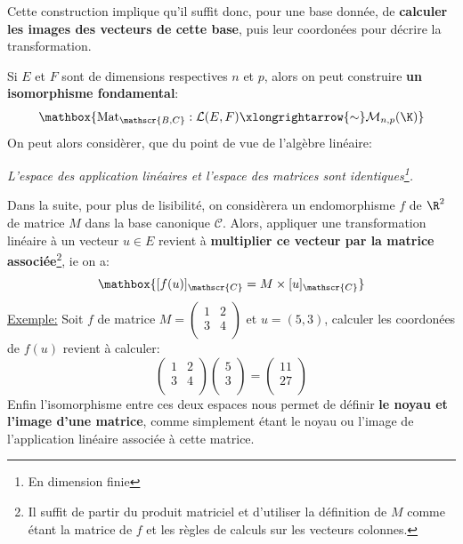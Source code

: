 Cette construction implique qu'il suffit donc, pour une base donnée, de \textbf{calculer les images des vecteurs de cette base}, puis leur coordonées pour décrire la transformation.\<

Si \(E\) et \(F\) sont de dimensions respectives \(n\) et \(p\), alors on peut construire \textbf{un isomorphisme fondamental}:
\[
   \mathbox{
      \text{Mat}_{\mathscr{B, C}} : \mathcal{L}(E, F) \xlongrightarrow{\sim} \mathcal{M}_{n, p}(\K)  
   }
\]
On peut alors considèrer, que du point de vue de l'algèbre linéaire:
\begin{center}
   \textit{L'espace des application linéaires et l'espace des matrices sont identiques\footnote[1]{En dimension finie}.}
\end{center}

Dans la suite, pour plus de lisibilité, on considèrera un endomorphisme \(f\) de \(\R^2\) de matrice \(M\) dans la base canonique \(\mathscr{C}\).
Alors, appliquer une transformation linéaire à un vecteur \(u \in E\) revient à \textbf{multiplier ce vecteur par la matrice associée}\footnote[2]{Il suffit de partir du produit matriciel et d'utiliser la définition de \(M\) comme étant la matrice de \(f\) et les règles de calculs sur les vecteurs colonnes.}, ie on a:
\[
   \mathbox{
      [f(u)]_{\mathscr{C}} = M \times [u]_{\mathscr{C}}
   }
\]
\underline{Exemple:} Soit \(f\) de matrice 
\(M = \begin{pmatrix}
   1 & 2\\
   3 & 4\\
\end{pmatrix}\) 
et \(u = (5, 3)\), calculer les coordonées de \(f(u)\) revient à calculer:
\[
   \begin{pmatrix}
      1 & 2\\
      3 & 4\\
   \end{pmatrix}
   \begin{pmatrix}
      5 \\
      3 \\
   \end{pmatrix} =
   \begin{pmatrix}
      11 \\
      27 \\
   \end{pmatrix} 
\]
Enfin l'isomorphisme entre ces deux espaces nous permet de définir \textbf{le noyau et l'image d'une matrice}, comme simplement étant le noyau ou l'image de l'application linéaire associée à cette matrice.

